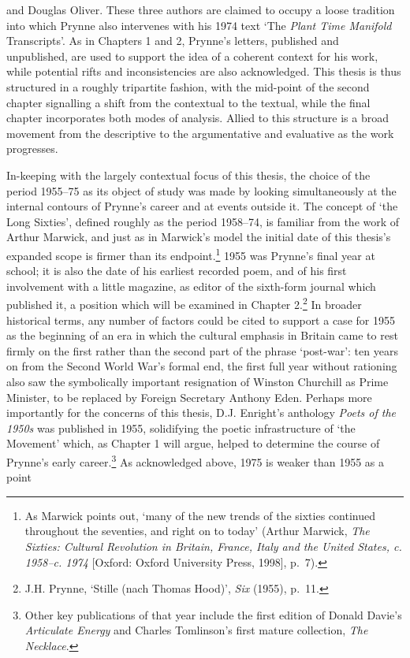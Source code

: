 \documentclass[]{article}
\begin{document}
and Douglas Oliver. These three authors are claimed to occupy a loose
tradition into which Prynne also intervenes with his 1974 text ‘The
\emph{Plant Time Manifold} Transcripts’. As in Chapters 1 and 2,
Prynne’s letters, published and unpublished, are used to support the
idea of a coherent context for his work, while potential rifts and
inconsistencies are also acknowledged. This thesis is thus structured in
a roughly tripartite fashion, with the mid-point of the second chapter
signalling a shift from the contextual to the textual, while the final
chapter incorporates both modes of analysis. Allied to this structure is
a broad movement from the descriptive to the argumentative and
evaluative as the work progresses.

In-keeping with the largely contextual focus of this thesis, the choice
of the period 1955–75 as its object of study was made by looking
simultaneously at the internal contours of Prynne’s career and at events
outside it. The concept of ‘the Long Sixties’, defined roughly as the
period 1958–74, is familiar from the work of Arthur Marwick, and just as
in Marwick’s model the initial date of this thesis’s expanded scope is
firmer than its endpoint.\footnote{As Marwick points out, ‘many of the
  new trends of the sixties continued throughout the seventies, and
  right on to today’ (Arthur Marwick, \emph{The Sixties: Cultural
  Revolution in Britain, France, Italy and the United States, c. 1958–c.
  1974} {[}Oxford: Oxford University Press, 1998{]}, p.~7).} 1955 was
Prynne’s final year at school; it is also the date of his earliest
recorded poem, and of his first involvement with a little magazine, as
editor of the sixth-form journal which published it, a position which
will be examined in Chapter 2.\footnote{J.H. Prynne, ‘Stille (nach
  Thomas Hood)’, \emph{Six} (1955), p.~11.} In broader historical terms,
any number of factors could be cited to support a case for 1955 as the
beginning of an era in which the cultural emphasis in Britain came to
rest firmly on the first rather than the second part of the phrase
‘post-war’: ten years on from the Second World War’s formal end, the
first full year without rationing also saw the symbolically important
resignation of Winston Churchill as Prime Minister, to be replaced by
Foreign Secretary Anthony Eden. Perhaps more importantly for the
concerns of this thesis, D.J. Enright’s anthology \emph{Poets of the
1950s} was published in 1955, solidifying the poetic infrastructure of
‘the Movement’ which, as Chapter 1 will argue, helped to determine the
course of Prynne’s early career.\footnote{Other key publications of that
  year include the first edition of Donald Davie’s \emph{Articulate
  Energy} and Charles Tomlinson’s first mature collection, \emph{The
  Necklace}.} As acknowledged above, 1975 is weaker than 1955 as a point
\end{document}
